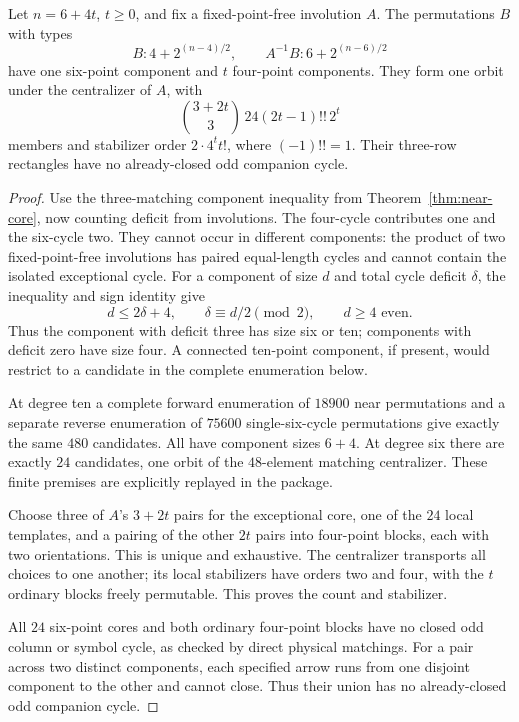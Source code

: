 \begin{computationaltheorem}
\label{thm:mixed-core}
Let $n=6+4t$, $t\geq0$, and fix a fixed-point-free involution $A$.
The permutations $B$ with types
\[
 B:4+2^{(n-4)/2},\qquad A^{-1}B:6+2^{(n-6)/2}
\]
have one six-point component and $t$ four-point components. They form
one orbit under the centralizer of $A$, with
\[
 \binom{3+2t}{3}\,24(2t-1)!!\,2^t
\]
members and stabilizer order $2\cdot4^t t!$, where $(-1)!!=1$.
Their three-row rectangles have no already-closed odd companion cycle.
\end{computationaltheorem}
\begin{proof}
Use the three-matching component inequality from
Theorem~\ref{thm:near-core}, now counting deficit from involutions.
The four-cycle contributes one and the six-cycle two. They cannot
occur in different components: the product of two fixed-point-free
involutions has paired equal-length cycles and cannot contain the
isolated exceptional cycle. For a component of size $d$ and total
cycle deficit $\delta$, the inequality and sign identity give
\[
d\leq2\delta+4,\qquad \delta\equiv d/2\pmod2,\qquad d\geq4\text{ even}.
\]
Thus the component with deficit three has size six or ten; components
with deficit zero have size four. A connected ten-point component,
if present, would restrict to a candidate in the complete enumeration below.

At degree ten a complete forward enumeration of $18900$ near
permutations and a separate reverse enumeration of $75600$
single-six-cycle permutations give exactly the same $480$ candidates.
All have component sizes $6+4$. At degree six there are exactly
$24$ candidates, one orbit of the $48$-element matching centralizer.
These finite premises are explicitly replayed in the package.

Choose three of $A$'s $3+2t$ pairs for the exceptional core, one
of the $24$ local templates, and a pairing of the other $2t$ pairs
into four-point blocks, each with two orientations. This is unique
and exhaustive. The centralizer transports all choices to one another;
its local stabilizers have orders two and four, with the $t$ ordinary
blocks freely permutable. This proves the count and stabilizer.

All $24$ six-point cores and both ordinary four-point blocks have
no closed odd column or symbol cycle, as checked by direct physical
matchings. For a pair across two distinct components, each specified
arrow runs from one disjoint component to the other and cannot close.
Thus their union has no already-closed odd companion cycle.
\end{proof}

